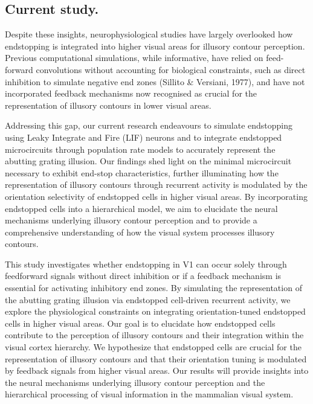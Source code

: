 \documentclass[12pt]{article}
\begin{document}
\bigbreak
\subsection{Current study.}
Despite these insights, neurophysiological studies have largely overlooked how endstopping is integrated into higher visual areas for illusory contour perception. Previous computational simulations, while informative, have relied on feed-forward convolutions without accounting for biological constraints, such as direct inhibition to simulate negative end zones (Sillito \& Versiani, 1977), and have not incorporated feedback mechanisms now recognised as crucial for the representation of illusory contours in lower visual areas.

\noindent Addressing this gap, our current research endeavours to simulate endstopping using Leaky Integrate and Fire (LIF) neurons and to integrate endstopped microcircuits through population rate models to accurately represent the abutting grating illusion. Our findings shed light on the minimal microcircuit necessary to exhibit end-stop characteristics, further illuminating how the representation of illusory contours through recurrent activity is modulated by the orientation selectivity of endstopped cells in higher visual areas. By incorporating endstopped cells into a hierarchical model, we aim to elucidate the neural mechanisms underlying illusory contour perception and to provide a comprehensive understanding of how the visual system processes illusory contours.

\noindent This study investigates whether endstopping in V1 can occur solely through feedforward signals without direct inhibition or if a feedback mechanism is essential for activating inhibitory end zones. By simulating the representation of the abutting grating illusion via endstopped cell-driven recurrent activity, we explore the physiological constraints on integrating orientation-tuned endstopped cells in higher visual areas. Our goal is to elucidate how endstopped cells contribute to the perception of illusory contours and their integration within the visual cortex hierarchy. We hypothesize that endstopped cells are crucial for the representation of illusory contours and that their orientation tuning is modulated by feedback signals from higher visual areas. Our results will provide insights into the neural mechanisms underlying illusory contour perception and the hierarchical processing of visual information in the mammalian visual system.

\newpage
\end{document}
